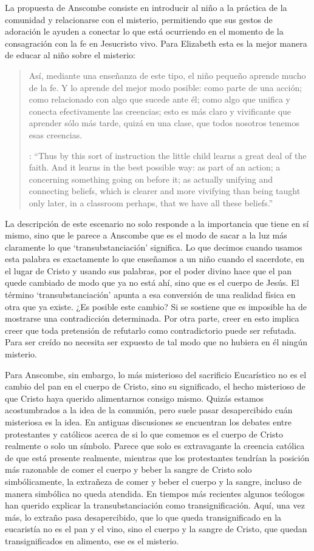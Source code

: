 La propuesta de Anscombe consiste en introducir al niño a la práctica de la comunidad y relacionarse con el misterio, permitiendo que sus gestos de adoración le ayuden a conectar lo que está ocurriendo en el momento de la consagración con la fe en Jesucristo vivo. Para Elizabeth esta es la mejor manera de educar al niño sobre el misterio: \blockquote[{\cite[107]{anscombe1981erp:ot}}: \enquote{Thus by this sort of instruction the little child learns a great deal of the faith. And it learns in the best possible way: as part of an action; a concerning something going on before it; as actually unifying and connecting beliefs, which is clearer and more vivifying than being taught only later, in a classroom perhaps, that we have all these beliefs.}]{Así, mediante una enseñanza de este tipo, el niño pequeño aprende mucho de la fe. Y lo aprende del mejor modo posible: como parte de una acción; como relacionado con algo que sucede ante él; como algo que unifica y conecta efectivamente las creencias; esto es más claro y vivificante que aprender sólo más tarde, quizá en una clase, que todos nosotros tenemos esas creencias.}

La descripción de este escenario no solo responde a la importancia que tiene en sí mismo, sino que le parece a Anscombe que es el modo de sacar a la luz más claramente lo que `transubstanciación' significa. Lo que decimos cuando usamos esta palabra es exactamente lo que enseñamos a un niño cuando el sacerdote, en el lugar de Cristo y usando sus palabras, por el poder divino hace que el pan quede cambiado de modo que ya no está ahí, sino que es el cuerpo de Jesús. El término `transubstanciación' apunta a esa conversión de una realidad física en otra que ya existe. ¿Es posible este cambio? Si se sostiene que es imposible ha de mostrarse una contradicción determinada. Por otra parte, creer en esto implica creer que toda pretensión de refutarlo como contradictorio puede ser refutada. Para ser creído no necesita ser expuesto de tal modo que no hubiera en él ningún misterio.

Para Anscombe, sin embargo, lo más misterioso del sacrificio Eucarístico no es el cambio del pan en el cuerpo de Cristo, sino su significado, el hecho misterioso de que Cristo haya querido alimentarnos consigo mismo. Quizás estamos acostumbrados a la idea de la comunión, pero suele pasar desapercibido cuán misteriosa es la idea. En antiguas discusiones se encuentran los debates entre protestantes y católicos acerca de si lo que comemos es el cuerpo de Cristo realmente o solo un símbolo. Parece que solo es extravagante la creencia católica de que está presente realmente, mientras que los protestantes tendrían la posición más razonable de comer el cuerpo y beber la sangre de Cristo solo simbólicamente, la extrañeza de comer y beber el cuerpo y la sangre, incluso de manera simbólica no queda atendida. En tiempos más recientes algunos teólogos han querido explicar la transubstanciación como transignificación. Aquí, una vez más, lo extraño pasa desapercibido, que lo que queda transignificado en la eucaristía no es el pan y el vino, sino el cuerpo y la sangre de Cristo, que quedan transignificados en alimento, ese es el misterio.


